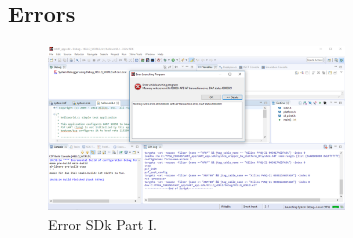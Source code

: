 \subsection{Errors}\label{subsec: Errors}
\begin{figure}[H]
	\centering
	\includegraphics[width=0.7\textwidth]{01_images/Vivado_lab4_part1_SecondErrorSDK.PNG}
	\caption{Error SDk Part I.}
	\label{fig: Vivado_lab4_part1_SecondErrorSDK}
\end{figure}
%

